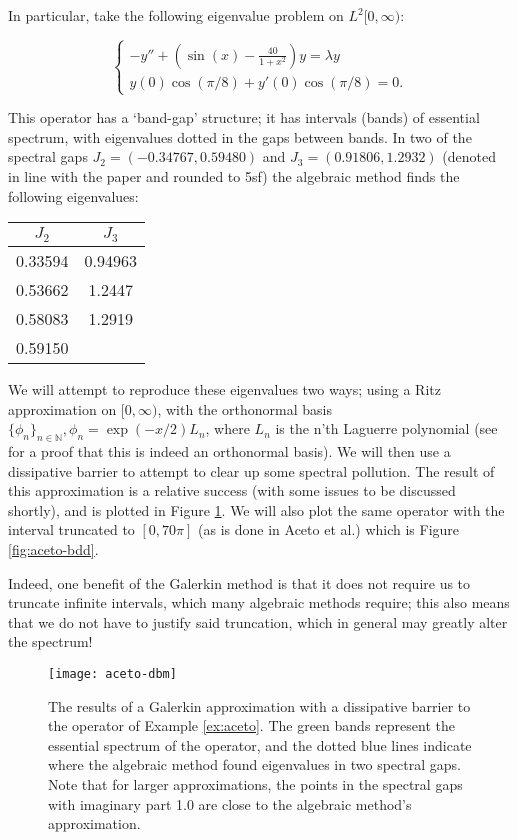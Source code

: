 \documentclass[../main.tex]{subfiles}
\begin{document}
\begin{example}\label{ex:aceto} In particular, take the following eigenvalue
	problem on $L^2[0, \infty)$:

$$ \begin{cases} -y'' + (\sin(x) - \frac{40}{1+x^2})y = \lambda y \\ y(0)
\cos(\pi/8) + y'(0) \cos(\pi/8) = 0. \end{cases} $$

This operator has a `band-gap' structure; it has intervals (bands) of essential
spectrum, with eigenvalues dotted in the gaps between bands. In two of
the spectral gaps $J_2 = (-0.34767, 0.59480)$ and $J_3 = (0.91806,
1.2932)$ (denoted in line with the paper and rounded to 5sf) the
algebraic method finds the following eigenvalues:

\begin{figure*}[h!]
\centering \begin{tabular}{c c}
  $J_2$ & $J_3$ \\
  \hline\hline
  0.33594 & 0.94963 \\
  0.53662 & 1.2447 \\
  0.58083 & 1.2919 \\
  0.59150 & \\
\end{tabular}
\end{figure*}

We will attempt to reproduce these eigenvalues two ways; using a
Ritz approximation on $[0, \infty)$, with the orthonormal basis
$\{\phi_n\}_{n \in \mathbb{N}}, \phi_n = \exp(-x/2)L_n$, where $L_n$ is
the n'th Laguerre polynomial (see \cite{szego1975orthogonal} for a proof
that this is indeed an orthonormal basis). We will then use a dissipative
barrier to attempt to clear up some spectral pollution.
The result of this approximation is a relative success (with some issues
to be discussed shortly), 
and is plotted in Figure \ref{fig:aceto-dbm}.
We will also plot the same operator with the interval truncated to $[0, 70\pi]$
(as is done in Aceto et al.) which is Figure \ref{fig:aceto-bdd}.

Indeed, one benefit of the Galerkin method is that it does not require us to
truncate infinite intervals, which many algebraic methods require; this also
means that we do not have to justify said truncation, which in general may
greatly alter the spectrum!
\end{example}

\begin{figure}[p!]
\centering
\texttt{[image: aceto-dbm]}
\caption{The results of a Galerkin approximation with a dissipative
	barrier to the operator of Example \ref{ex:aceto}. The green bands
	represent the essential spectrum of the operator, and the dotted blue
	lines indicate where the algebraic method found eigenvalues in two
	spectral gaps. Note that for larger approximations, the points in the
	spectral gaps with imaginary part 1.0 are close to the algebraic
	method's approximation.}
\label{fig:aceto-dbm}
\end{figure}
\end{document}
